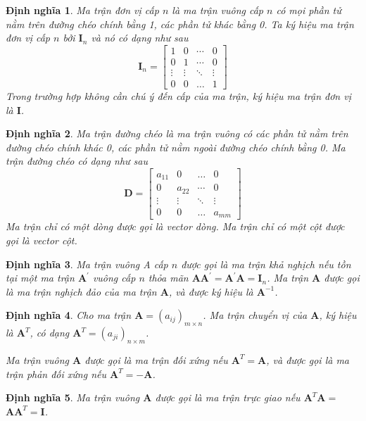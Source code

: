 \documentclass[12pt,a4paper,oneside]{report}
\newtheorem{dn}{Định nghĩa}[section]
\numberwithin{equation}{section}
\begin{document}
\begin{dn}\cite{hieu2019} 
	Ma trận đơn vị cấp $n$ là ma trận vuông cấp $n$ có mọi phần tử nằm trên đường chéo chính bằng 1, các phần tử khác bằng 0. Ta ký hiệu ma trận đơn vị cấp $n$ bởi $\mathbf{I}_{n}$ và nó có dạng như sau
$$
\mathbf{I}_{n}=\left[\begin{array}{cccc}
	1 & 0 & \cdots & 0 \\
	0 & 1 & \cdots & 0 \\
	\vdots & \vdots & \ddots & \vdots \\
	0 & 0 & \ldots & 1
\end{array}\right]
$$
Trong trường hợp không cần chú ý đến cấp của ma trận, ký hiệu ma trận đơn vị là $\mathbf{I}$.
\end{dn}
\begin{dn}\cite{an2015}                     
Ma trận đường chéo là ma trận vuông có các phần tử nằm trên đường chéo chính khác 0, các phần tử nằm ngoài đường chéo chính bằng 0. Ma trận đường chéo có dạng như sau
$$
\mathbf{D}=\left[\begin{array}{cccc}
	a_{11} & 0 & \ldots & 0 \\
	0 & a_{22} & \cdots & 0 \\
	\vdots & \vdots & \ddots & \vdots \\
	0 & 0 & \ldots & a_{m m}
\end{array}\right]
$$
Ma trận chỉ có một dòng được gọi là vector dòng. Ma trận chỉ có một cột được gọi là vector cột.
\end{dn}
\begin{dn}\cite{hung2000}
	Ma trận vuông A cấp $n$ được gọi là ma trận khả nghịch nếu tồn tại một ma trận $\mathbf{A}^{\prime}$ vuông cấp $n$ thỏa mãn $\mathbf{A} \mathbf{A}^{\prime}=\mathbf{A}^{\prime} \mathbf{A}=\mathbf{I}_{n}$. Ma trận $\mathbf{A}$ được gọi là ma trận nghịch đảo của ma trận $\mathbf{A}$, và được ký hiệu là $\mathbf{A}^{-1}$.
\end{dn}
\begin{dn}\cite{hieu2019} 
	Cho ma trận $\mathbf{A}=\left(a_{i j}\right)_{m \times n}$. Ma trận chuyển vị của $\mathbf{A}$, ký hiệu là $\mathbf{A}^{T}$, có dạng $\mathbf{A}^{T}=\left(a_{j i}\right)_{n \times m}$.
	
	Ma trận vuông $\mathbf{A}$ được gọi là ma trận đối xứng nếu $\mathbf{A}^{T}=\mathbf{A}$, và được gọi là ma trận phản đối xứng nếu $\mathbf{A}^{T}=-\mathbf{A}$.
\end{dn}
\begin{dn}\cite{hieu2019}
	Ma trận vuông $\mathbf{A}$ được gọi là ma trận trực giao nếu $\mathbf{A}^{T} \mathbf{A}=$ $\mathbf{A A}^{T}=\mathbf{I}$.
\end{dn}	
\end{document}
